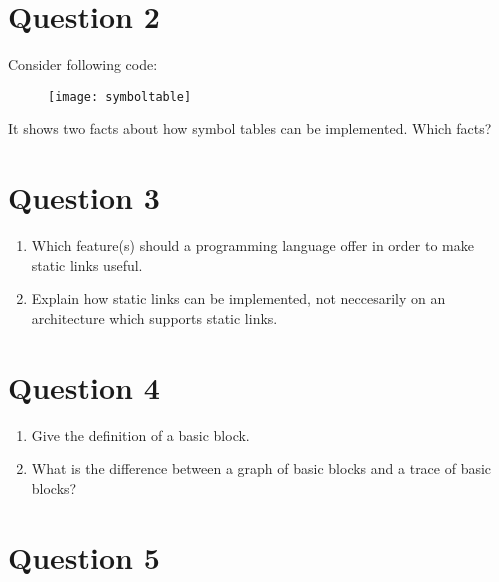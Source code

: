 \documentclass{report}
\begin{document}
\section*{Question 2}
Consider following code:
\begin{figure}[ht]
    \centering
    \texttt{[image: symboltable]}
\end{figure}
It shows two facts about how symbol tables can be implemented. Which facts?

\newpage
\section*{Question 3}
\begin{enumerate}
    \item Which feature(s) should a programming language offer in order to make static links useful.
    \item Explain how static links can be implemented, not neccesarily on an architecture which supports static links.
\end{enumerate}

\section*{Question 4}
\begin{enumerate}
    \item Give the definition of a basic block.
    \item What is the difference between a graph of basic blocks and a trace of basic blocks?
\end{enumerate}

\section*{Question 5}
\end{document}
